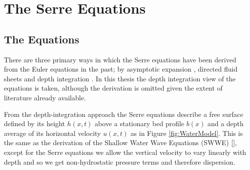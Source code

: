 
\chapter{The Serre Equations}
\label{chp:Serreeqns}









\section{The Equations}
There are three primary ways in which the Serre equations have been derived from the Euler equations in the past; by asymptotic expansion \cite{Serre-F-1953-857,Bonneton-Lannes-2009-16601}, directed fluid sheets \cite{Green-Naghdi-1976-237} and depth integration \cite{Su-Gardener-1969-536,Zoppou-2014}. In this thesis the depth integration view of the equations is taken, although the derivation is omitted given the extent of literature already available. 

From the depth-integration approach the Serre equations describe a free surface defined by its height $h(x,t)$ above a stationary bed profile $b(x)$ and a depth average of its horizontal velocity $u(x,t)$ as in Figure \ref{fig:WaterModel}. This is the same as the derivation of the Shallow Water Wave Equations (SWWE) [], except for the Serre equations we allow the vertical velocity to vary linearly with depth and so we get non-hydrostatic pressure terms and therefore dispersion.


